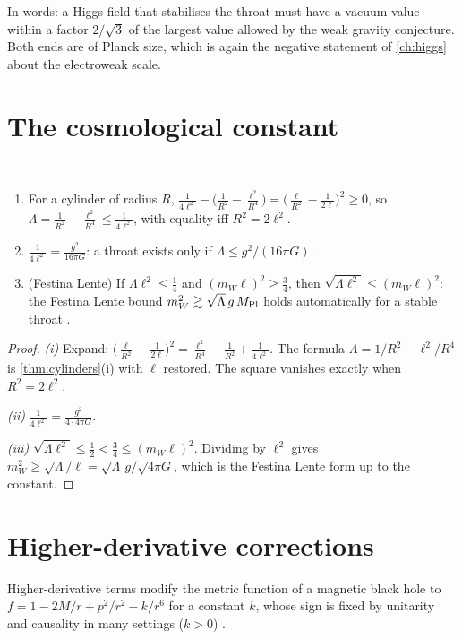 In words: a Higgs field that stabilises the throat must have a vacuum value within a factor $2/\sqrt3$ of the largest value allowed by the weak gravity conjecture. Both ends are of Planck size, which is again the negative statement of \cref{ch:higgs} about the electroweak scale.

\section{The cosmological constant}

\begin{theorem}\label{thm:wgclambda}\ver\
\begin{enumerate}[label=(\roman*)]
\item For a cylinder of radius $R$, $\frac1{4\ell^2}-\bigl(\frac1{R^2}-\frac{\ell^2}{R^4}\bigr)=\bigl(\frac\ell{R^2}-\frac1{2\ell}\bigr)^2\ge0$, so $\Lambda=\frac1{R^2}-\frac{\ell^2}{R^4}\le\frac1{4\ell^2}$, with equality iff $R^2=2\ell^2$.
\item $\frac1{4\ell^2}=\frac{g^2}{16\pi G}$: a throat exists only if $\Lambda\le g^2/(16\pi G)$.
\item (Festina Lente) If $\Lambda\ell^2\le\frac14$ and $(m_W\ell)^2\ge\frac34$, then $\sqrt{\Lambda\ell^2}\le(m_W\ell)^2$: the Festina Lente bound $m_W^2\gtrsim\sqrt{\Lambda}\,g\,M_{\rm Pl}$ \cite{Montero2020} holds automatically for a stable throat \ext.
\end{enumerate}
\end{theorem}
\begin{proof}
\emph{(i)} Expand: $\bigl(\frac\ell{R^2}-\frac1{2\ell}\bigr)^2=\frac{\ell^2}{R^4}-\frac1{R^2}+\frac1{4\ell^2}$. The formula $\Lambda=1/R^2-\ell^2/R^4$ is \cref{thm:cylinders}(i) with $\ell$ restored. The square vanishes exactly when $R^2=2\ell^2$.

\emph{(ii)} $\frac1{4\ell^2}=\frac{g^2}{4\cdot4\pi G}$.

\emph{(iii)} $\sqrt{\Lambda\ell^2}\le\frac12<\frac34\le(m_W\ell)^2$. Dividing by $\ell^2$ gives $m_W^2\ge\sqrt\Lambda/\ell=\sqrt\Lambda\,g/\sqrt{4\pi G}$, which is the Festina Lente form up to the constant.
\end{proof}


\section{Higher-derivative corrections}

Higher-derivative terms modify the metric function of a magnetic black hole to $f=1-2M/r+p^2/r^2-k/r^6$ for a constant $k$, whose sign is fixed by unitarity and causality in many settings ($k>0$) \cite{KatsMotlPadi2007,CheungLiuRemmen2018} \ext.

